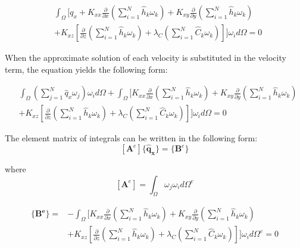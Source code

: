 \begin{equation}\label{WeightedResidual}
\begin{split}
&\int _{\Omega} \biggl[ q _x + K _{xx} \frac{\partial}{\partial x}\left(\sum_{i=1}^{N}{\hat h _k \omega _k}\right) + K _{xy} \frac{\partial}{\partial y}\left(\sum_{i=1}^{N}{\hat h _k \omega _k}\right) \\
&+K _{xz} \left[ \frac{\partial}{\partial z}\left(\sum_{i=1}^{N}{\hat h _k \omega _k}\right) + \lambda _C \left( \sum_{i=1}^{N}{\hat C _k \omega _k} \right) \right] \biggr] \omega _i d\Omega = 0
\end{split}
\end{equation}

When the approximate solution of each velocity is substituted in the velocity term, the equation yields the following form:

\begin{equation}\label{VelocityWeightedResidual}
\begin{split}
&\int _{\Omega} \left( \sum_{j=1}^{N}{\hat q _x \omega _j} \right) \omega _i d\Omega + \int _{\Omega} \biggl[ K _{xx} \frac{\partial}{\partial x}\left(\sum_{i=1}^{N}{\hat h _k \omega _k}\right) + K _{xy} \frac{\partial}{\partial y}\left(\sum_{i=1}^{N}{\hat h _k \omega _k}\right) \\
&+K _{xz} \left[ \frac{\partial}{\partial z}\left(\sum_{i=1}^{N}{\hat h _k \omega _k}\right) + \lambda _C \left( \sum_{i=1}^{N}{\hat C _k \omega _k} \right) \right] \biggr] \omega _i d\Omega = 0
\end{split}
\end{equation}

The element matrix of integrals can be written in the following form:
\begin{equation}\label{elementMatrixOfVelocity}
[\mathbf A ^e]\{\mathbf{\hat q _x} \} = \{\mathbf B ^e\}
\end{equation}

where
\begin{equation}\label{elementMatrixA}
[\mathbf A ^e]=\int _{\Omega} \omega _j \omega _i d \Omega ^e
\end{equation}

\begin{equation}\label{elementVectorB}
\begin{split}
\{ \mathbf{B ^e} \}= &-\int _{\Omega} \biggl[ K _{xx} \frac{\partial}{\partial x}\left(\sum_{i=1}^{N}{\hat h _k \omega _k}\right) + K _{xy} \frac{\partial}{\partial y}\left(\sum_{i=1}^{N}{\hat h _k \omega _k}\right) \\
&+K _{xz} \left[ \frac{\partial}{\partial z}\left(\sum_{i=1}^{N}{\hat h _k \omega _k}\right) + \lambda _C \left( \sum_{i=1}^{N}{\hat C _k \omega _k} \right) \right] \biggr] \omega _i d\Omega ^e = 0
\end{split}
\end{equation}

